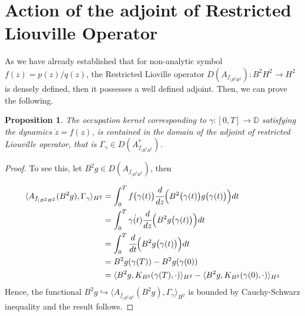 \documentclass[preprint,12pt]{elsarticle} %
\theoremstyle{plain}
\newtheorem{proposition}[theorem]{Proposition}
\theoremstyle{definition}
\theoremstyle{remark}
\begin{document}
\section{Action of the adjoint of Restricted Liouville Operator}\label{Sec 5}
As we have already established that for non-analytic symbol $f(z)=p(z)/q(z)$, the Restricted Lioville operator $D(A_{f_{|B^2 H^2}}): B^2H^2\rightarrow H^2$ is densely defined, then it possesses a well defined adjoint. Then, we can prove the following.

\begin{proposition}\label{pro 4.1}
    The occupation kernel corresponding to $\gamma:[0,T]\rightarrow \mathbb{D}$ satisfying the dynamics $\dot{z}=f(z)$, is contained in the domain of the adjoint of restricted Liouville operator, that is $\Gamma_{\gamma}\in D(A_{f_{|B^2 H^2}}^{*})$.
\end{proposition}
\begin{proof}
     To see this, let $B^2 g\in D(A_{f_{|B^2 H^2}})$, then

\begin{align*}
    \langle A_{f_{|B^2 H^2}} (B^2 g),\Gamma_{\gamma}\rangle_{H^2} &= \int_{0}^{T}f\big(\gamma(t)\big)\cfrac{d}{dz}\Big(B^2\big(\gamma(t)\big)g\big(\gamma(t)\big)\Big)dt\\
    &= \int_{0}^{T}\dot{\gamma(t)}\cfrac{d}{dz}\Big(B^2g\big(\gamma(t)\big)\Big)dt\\
    &= \int_{0}^{T}\cfrac{d}{dt}\Big(B^2g\big(\gamma(t)\big)\Big)dt\\
    & =  B^2g(\gamma(T))- B^2g(\gamma(0))\\
    & = \langle B^2 g, K_{B^2}(\gamma(T),\cdot)\rangle_{H^2}-\langle B^2 g, K_{B^2}(\gamma(0),\cdot)\rangle_{H^2}\\
    \end{align*}
Hence, the functional $B^2 g\hookrightarrow \langle A_{f_{|B^2 H^2}} (B^2 g),\Gamma_{\gamma}\rangle_{H^2}$ is bounded by Cauchy-Schwarz inequality and the result follows.
\end{proof}
\end{document}
